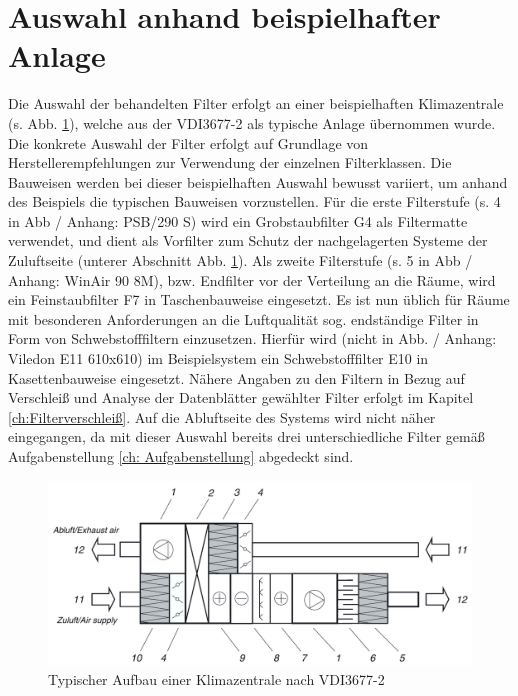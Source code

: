 \section{Auswahl anhand beispielhafter Anlage}
\label{sec:auswahl_konk}
Die Auswahl der behandelten Filter erfolgt an einer beispielhaften Klimazentrale (s. Abb. \ref{fi:beispielanlage}), welche aus der VDI3677-2 als typische Anlage übernommen wurde. Die konkrete Auswahl der Filter erfolgt auf Grundlage von Herstellerempfehlungen zur Verwendung der einzelnen Filterklassen. Die Bauweisen werden bei dieser beispielhaften Auswahl bewusst variiert, um anhand des Beispiels die typischen Bauweisen vorzustellen. Für die erste Filterstufe (s. 4 in Abb / Anhang: PSB/290 S) wird ein Grobstaubfilter G4 als Filtermatte verwendet, und dient als Vorfilter zum Schutz der nachgelagerten Systeme der Zuluftseite (unterer Abschnitt Abb. \ref{fi:beispielanlage}). Als zweite Filterstufe (s. 5 in Abb / Anhang: WinAir 90 8M), bzw. Endfilter vor der Verteilung an die Räume, wird ein Feinstaubfilter F7 in Taschenbauweise eingesetzt. Es ist nun üblich für Räume mit besonderen Anforderungen an die Luftqualität sog. endständige Filter in Form von Schwebstofffiltern einzusetzen. Hierfür wird (nicht in Abb. / Anhang: Viledon E11 610x610) im Beispielsystem ein Schwebstofffilter E10 in Kasettenbauweise eingesetzt. Nähere Angaben zu den Filtern in Bezug auf Verschleiß und Analyse der Datenblätter gewählter Filter erfolgt im Kapitel \ref{ch:Filterverschleiß}. Auf die Abluftseite des Systems wird nicht näher eingegangen, da mit dieser Auswahl bereits drei unterschiedliche Filter gemäß Aufgabenstellung \ref{ch: Aufgabenstellung} abgedeckt sind.\newpage
\begin{figure}[H]
    \begin{center}
        \includegraphics[width=\linewidth]{images/beispielanlage.png}
        \caption[Typische Klimazentrale]{Typischer Aufbau einer  Klimazentrale nach VDI3677-2 \cite{vdi3677_2} }
        \label{fi:beispielanlage}
    \end{center}
\end{figure}
